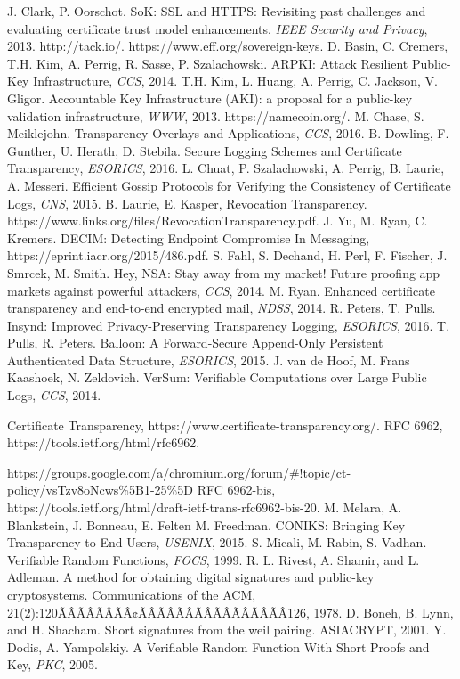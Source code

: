 \documentclass[letterpaper,twocolumn,10pt]{article}
\begin{document}
\begin{thebibliography}{9}

 J. Clark, P. Oorschot. SoK: SSL and HTTPS: Revisiting past challenges and evaluating certificate trust model enhancements. \emph{IEEE Security and Privacy}, 2013.
 http://tack.io/.
 https://www.eff.org/sovereign-keys.
 D. Basin, C. Cremers, T.H. Kim, A. Perrig, R. Sasse, P. Szalachowski. ARPKI: Attack Resilient Public-Key Infrastructure, \emph{CCS}, 2014.
 T.H. Kim, L. Huang, A. Perrig, C. Jackson, V. Gligor. Accountable Key Infrastructure (AKI): a proposal for a public-key validation infrastructure, \emph{WWW}, 2013.
 https://namecoin.org/.
 M. Chase, S. Meiklejohn. Transparency Overlays and Applications, \emph{CCS}, 2016. 
 B. Dowling,  F. Gunther, U. Herath, D. Stebila. Secure Logging Schemes and Certificate Transparency, \emph{ESORICS}, 2016.
 L. Chuat, P. Szalachowski, A. Perrig, B. Laurie, A. Messeri. Efficient Gossip Protocols for Verifying the Consistency of Certificate Logs, \emph{CNS}, 2015. 
 B. Laurie, E. Kasper, Revocation Transparency. https://www.links.org/files/RevocationTransparency.pdf.
 J. Yu, M. Ryan, C. Kremers. DECIM: Detecting Endpoint Compromise In Messaging, https://eprint.iacr.org/2015/486.pdf.
 S. Fahl, S. Dechand, H. Perl, F. Fischer, J. Smrcek, M. Smith. Hey, NSA: Stay away from my market! Future proofing app markets against powerful attackers, \emph{CCS}, 2014.
 M. Ryan. Enhanced certificate transparency and end-to-end encrypted mail, \emph{NDSS}, 2014.
 R. Peters, T. Pulls. Insynd: Improved Privacy-Preserving Transparency Logging, \emph{ESORICS}, 2016.
 T. Pulls, R. Peters. Balloon: A Forward-Secure Append-Only Persistent Authenticated Data Structure, \emph{ESORICS}, 2015.
 J. van de Hoof, M. Frans Kaashoek, N. Zeldovich. VerSum: Verifiable Computations over Large Public Logs, \emph{CCS}, 2014.

 Certificate Transparency, https://www.certificate-transparency.org/.
 RFC 6962, https://tools.ietf.org/html/rfc6962.

 https://groups.google.com/a/chromium.org/forum/\#!topic/ct-policy/vsTzv8oNcws\%5B1-25\%5D
 RFC 6962-bis, https://tools.ietf.org/html/draft-ietf-trans-rfc6962-bis-20.
 M. Melara, A. Blankstein, J. Bonneau, E. Felten M. Freedman. CONIKS: Bringing Key Transparency to End Users, \emph{USENIX}, 2015.
 S. Micali, M. Rabin, S. Vadhan. Verifiable Random Functions, \emph{FOCS}, 1999.
 R. L. Rivest, A. Shamir, and L. Adleman. A method for obtaining digital signatures and public-key cryptosystems. Communications of the ACM, 21(2):120ÃÂÃÂÃÂÃÂ¢ÃÂÃÂÃÂÃÂÃÂÃÂÃÂÃÂ126, 1978.
 D. Boneh, B. Lynn, and H. Shacham. Short signatures from the weil pairing. ASIACRYPT, 2001.
 Y. Dodis, A. Yampolskiy. A Verifiable Random Function With Short Proofs and Key, \emph{PKC}, 2005.


\end{thebibliography}
\end{document}
